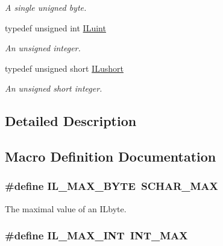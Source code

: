\begin{DoxyCompactItemize}
\begin{DoxyCompactList}\small\item\em A single unigned byte. \end{DoxyCompactList}\item 
typedef unsigned int \hyperlink{group__il__types_gaff8e86a1072c8d7cfe387fb87c6ed8e1}{I\+Luint}
\begin{DoxyCompactList}\small\item\em An unsigned integer. \end{DoxyCompactList}\item 
typedef unsigned short \hyperlink{group__il__types_gac0f1c4cfe288e56c059cd2030f9682d5}{I\+Lushort}
\begin{DoxyCompactList}\small\item\em An unsigned short integer. \end{DoxyCompactList}\end{DoxyCompactItemize}


\subsection{Detailed Description}


\subsection{Macro Definition Documentation}
\hypertarget{group__il__types_ga4649bcaa712dfa3ac8624ea45e7d7ed8}{
\subsubsection[{I\+L\+\_\+\+M\+A\+X\+\_\+\+B\+Y\+T\+E}]{\setlength{\rightskip}{0pt plus 5cm}\#define I\+L\+\_\+\+M\+A\+X\+\_\+\+B\+Y\+T\+E~S\+C\+H\+A\+R\+\_\+\+M\+A\+X}}\label{group__il__types_ga4649bcaa712dfa3ac8624ea45e7d7ed8}


The maximal value of an I\+Lbyte. 

\hypertarget{group__il__types_gadcca3decb5e180a8c2a0379cb9e7f607}{
\subsubsection[{I\+L\+\_\+\+M\+A\+X\+\_\+\+I\+N\+T}]{\setlength{\rightskip}{0pt plus 5cm}\#define I\+L\+\_\+\+M\+A\+X\+\_\+\+I\+N\+T~I\+N\+T\+\_\+\+M\+A\+X}}\label{group__il__types_gadcca3decb5e180a8c2a0379cb9e7f607}


